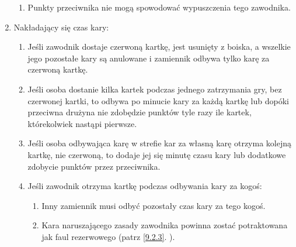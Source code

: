 \documentclass[11pt,a4paper]{article}
\newcommand{\myref}[1]{\ref{#1}. \nameref{#1}}
\begin{document}
\begin{enumerate}
\begin{enumerate}
    \item Punkty przeciwnika nie mogą spowodować wypuszczenia tego zawodnika.
  \end{enumerate}
  \item Nakładający się czas kary:
  \begin{enumerate}
    \item Jeśli zawodnik dostaje czerwoną kartkę, jest usunięty z boiska, a wszelkie jego pozostałe kary są anulowane i zamiennik odbywa tylko karę za czerwoną kartkę.
    \item Jeśli osoba dostanie kilka kartek podczas jednego zatrzymania gry, bez czerwonej kartki, to odbywa po minucie kary za każdą kartkę lub dopóki przeciwna drużyna nie zdobędzie punktów tyle razy ile kartek, którekolwiek nastąpi pierwsze.
    \item Jeśli osoba odbywająca karę w strefie kar za własną karę otrzyma kolejną kartkę, nie czerwoną, to dodaje jej się minutę czasu kary lub dodatkowe zdobycie punktów przez przeciwnika.
    \item Jeśli zawodnik otrzyma kartkę podczas odbywania kary za kogoś:
    \begin{enumerate}
      \item Inny zamiennik musi odbyć pozostały czas kary za tego kogoś.
      \item Kara naruszającego zasady zawodnika powinna zostać potraktowana jak faul rezerwowego (patrz \myref{9.2.3}).
    \end{enumerate}
  \end{enumerate}
\end{enumerate}
\end{document}
